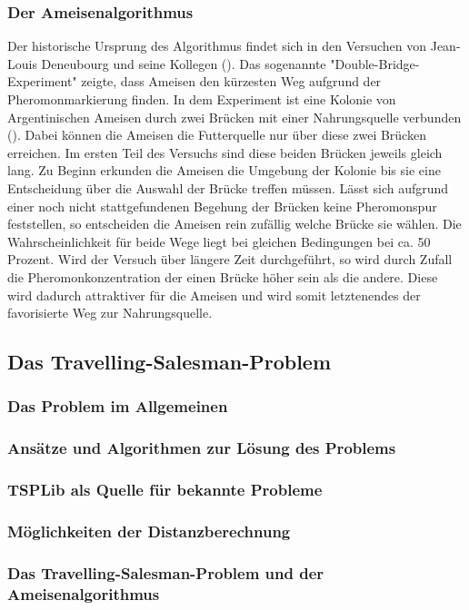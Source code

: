 \documentclass[doktyp=barbeit, sprache=german]{TUBAFarbeiten}
\begin{document}
\subsubsection{Der Ameisenalgorithmus}
Der historische Ursprung des Algorithmus findet sich in den Versuchen von Jean-Louis Deneubourg und seine Kollegen (\cite{Biological}). Das sogenannte "Double-Bridge-Experiment" zeigte, dass Ameisen den kürzesten Weg aufgrund der Pheromonmarkierung finden. In dem Experiment ist eine Kolonie von Argentinischen Ameisen durch zwei Brücken mit einer Nahrungsquelle verbunden (\cite{Dorigo:2007}). Dabei können die Ameisen die Futterquelle nur über diese zwei Brücken erreichen. Im ersten Teil des Versuchs sind diese beiden Brücken jeweils gleich lang. Zu Beginn erkunden die Ameisen die Umgebung der Kolonie bis sie eine Entscheidung über die Auswahl der Brücke treffen müssen. Lässt sich aufgrund einer noch nicht stattgefundenen Begehung der Brücken keine Pheromonspur feststellen, so entscheiden die Ameisen rein zufällig welche Brücke sie wählen. Die Wahrscheinlichkeit für beide Wege liegt bei gleichen Bedingungen bei ca. 50 Prozent. Wird der Versuch über längere Zeit durchgeführt, so wird durch Zufall die Pheromonkonzentration der einen Brücke höher sein als die andere. Diese wird dadurch attraktiver für die Ameisen und wird somit letztenendes der favorisierte Weg zur Nahrungsquelle.
\subsection{Das Travelling-Salesman-Problem}
\subsubsection{Das Problem im Allgemeinen}
\subsubsection{Ansätze und Algorithmen zur Lösung des Problems}
\subsubsection{TSPLib als Quelle für bekannte Probleme}
\subsubsection{Möglichkeiten der Distanzberechnung}
\subsubsection{Das Travelling-Salesman-Problem und der Ameisenalgorithmus}
\end{document}
